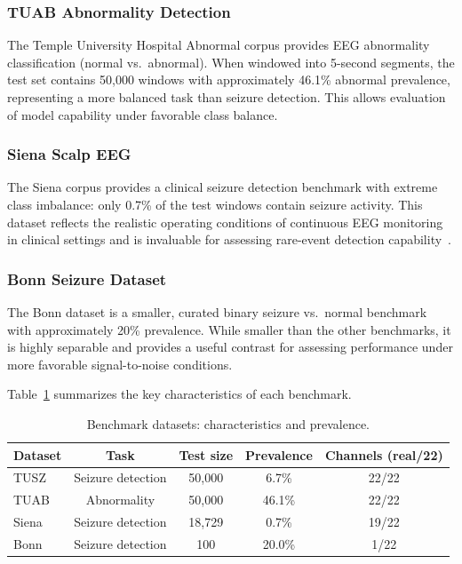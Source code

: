 \documentclass[journal]{IEEEtran}
\begin{document}
\subsubsection{TUAB Abnormality Detection}
The Temple University Hospital Abnormal corpus provides EEG abnormality classification (normal vs.\ abnormal). When windowed into 5-second segments, the test set contains 50,000 windows with approximately 46.1\% abnormal prevalence, representing a more balanced task than seizure detection. This allows evaluation of model capability under favorable class balance.

\subsubsection{Siena Scalp EEG}
The Siena corpus provides a clinical seizure detection benchmark with extreme class imbalance: only 0.7\% of the test windows contain seizure activity. This dataset reflects the realistic operating conditions of continuous EEG monitoring in clinical settings and is invaluable for assessing rare-event detection capability~\cite{siena_dataset}.

\subsubsection{Bonn Seizure Dataset}
The Bonn dataset is a smaller, curated binary seizure vs.\ normal benchmark with approximately 20\% prevalence. While smaller than the other benchmarks, it is highly separable and provides a useful contrast for assessing performance under more favorable signal-to-noise conditions.

Table~\ref{tab:datasets} summarizes the key characteristics of each benchmark.

\begin{table}[t]
\centering
\caption{Benchmark datasets: characteristics and prevalence.}
\label{tab:datasets}
\small
\begin{tabular}{@{}lcccc@{}}
\toprule
Dataset & Task & Test size & Prevalence & Channels (real/22) \\
\midrule
TUSZ & Seizure detection & 50,000 & 6.7\% & 22/22 \\
TUAB & Abnormality & 50,000 & 46.1\% & 22/22 \\
Siena & Seizure detection & 18,729 & 0.7\% & 19/22 \\
Bonn & Seizure detection & 100 & 20.0\% & 1/22 \\
\bottomrule
\end{tabular}
\end{table}
\end{document}

